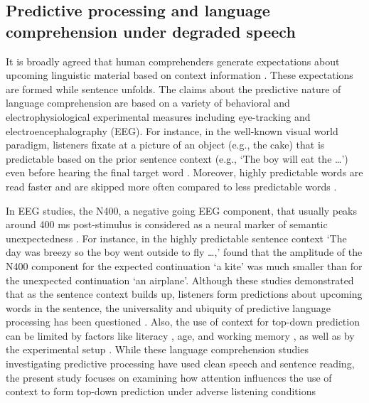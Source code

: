 \documentclass[a4paper, nobind]{templates/ociamthesis}
\begin{document}
\hypertarget{predictive-processing-and-language-comprehension-under-degraded-speech}{%
\subsection{Predictive processing and language comprehension under degraded speech}\label{predictive-processing-and-language-comprehension-under-degraded-speech}}

It is broadly agreed that human comprehenders generate expectations about upcoming linguistic material based on context information \autocites[for reviews, see][]{Kuperberg2016,Nieuwland2019,Pickering2018,Staub2015}.
These expectations are formed while sentence unfolds. The claims about the predictive nature of language comprehension are based on a variety of behavioral and electrophysiological experimental measures including eye-tracking and electroencephalography (EEG).
For instance, in the well-known visual world paradigm, listeners fixate at a picture of an object (e.g., the cake) that is predictable based on the prior sentence context (e.g., `The boy will eat the \ldots{}') even before hearing the final target word \autocites[e.g.,][]{Altmann1999,Altmann2007,Ankener2018}.
Moreover, highly predictable words are read faster and are skipped more often compared to less predictable words \autocite{Frisson2005,Rayner2011}.

In EEG studies, the N400, a negative going EEG component, that usually peaks around 400 ms post-stimulus is considered as a neural marker of semantic unexpectedness \autocite{Kutas2011}.
For instance, in the highly predictable sentence context `The day was breezy so the boy went outside to fly \ldots,' \textcite{Delong2005} found that the amplitude of the N400 component for the expected continuation `a kite' was much smaller than for the unexpected continuation `an airplane'.
Although these studies demonstrated that as the sentence context builds up, listeners form predictions about upcoming words in the sentence, the universality and ubiquity of predictive language processing has been questioned \autocite[see][]{Huettig2016}.
Also, the use of context for top-down prediction can be limited by factors like literacy \autocite{Mishra2012}, age, and working memory \autocite{Federmeier2010,Federmeier2002}, as well as by the experimental setup \autocite{Huettig2019}.
While these language comprehension studies investigating predictive processing have used clean speech and sentence reading, the present study focuses on examining how attention influences the use of context to form top-down prediction under adverse listening conditions
\end{document}
